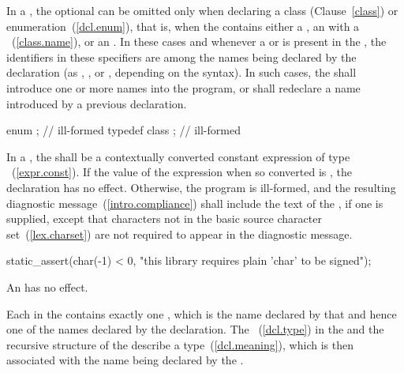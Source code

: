 \pnum
{}%
%
In a , the optional
 can be omitted only when declaring a
class (Clause~\ref{class}) or enumeration~(\ref{dcl.enum}), that is,
when the  contains either a
, an  with
a ~(\ref{class.name}), or an
. In these cases and whenever a
 or  is present in
the , the identifiers in these specifiers
are among the names being declared by the declaration (as
, , or
, depending on the syntax). In such cases,
the  shall introduce one or more names into
the program, or shall redeclare a name introduced by a previous
declaration.
\enterexample

\begin{codeblock}
enum { };           // ill-formed
typedef class { };  //  ill-formed
\end{codeblock}
\exitexample

\pnum
{}%
In a , the
 shall be
a contextually converted constant expression
of type ~(\ref{expr.const}).
If the value of the expression when
so converted is , the declaration has no
effect. Otherwise, the program is ill-formed, and the resulting
diagnostic message~(\ref{intro.compliance}) shall include the text of
the , if one is supplied,
except that characters not in the basic
source character set~(\ref{lex.charset}) are not required to appear in
the diagnostic message.
\enterexample

\begin{codeblock}
static_assert(char(-1) < 0, "this library requires plain 'char' to be signed");
\end{codeblock}\exitexample

\pnum
An  has no effect.

\pnum
Each  in the 
contains exactly one , which is the name
declared by that  and hence one of the names
declared by the declaration. The
~(\ref{dcl.type}) in the
 and the recursive 
structure of the  describe a
type~(\ref{dcl.meaning}), which is then associated with the name being
declared by the .

